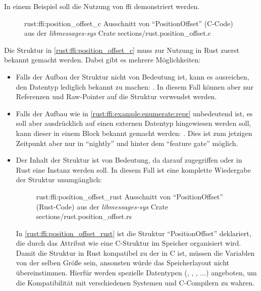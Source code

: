 In einem Beispiel soll die Nutzung von \gls{ffi} demonstriert werden.

\begin{figure}[H]
	\ccinclude
		{rust:ffi:position_offset_c}
		{Ausschnitt von \enquote{PositionOffset} (C-Code) aus der \textit{libmessages-sys} Crate}
		{sections/rust.position_offset.c}
	
\end{figure}

Die Struktur in \autoref{rust:ffi:position_offset_c} muss zur Nutzung in Rust zuerst bekannt gemacht werden.
Dabei gibt es mehrere Möglichkeiten:
\begin{itemize}
	\item Falls der Aufbau der Struktur nicht von Bedeutung ist, kann es ausreichen, den Datentyp lediglich bekannt zu machen: .
	In diesem Fall können aber nur Referenzen und Raw-Pointer auf die Struktur verwendet werden.
	\label{rust:ffi:example:enumerate:repr}
	
	\item Falls der Aufbau wie in \autoref{rust:ffi:example:enumerate:repr} unbedeutend ist, es soll aber ausdrücklich auf einen externen Datentyp hingewiesen werden soll, kann dieser in einem  Block bekannt gemacht werden:  \cite{rust:github:extern_type}.
	Dies ist zum jetzigen Zeitpunkt aber nur in \enquote{nightly} und hinter dem \enquote{feature gate}  möglich.
	
	\item Der Inhalt der Struktur ist von Bedeutung, da darauf zugegriffen oder in Rust eine Instanz werden soll. In diesem Fall ist eine komplette Wiedergabe der Struktur unumgänglich:
	\begin{figure}[H]
		\rustcinclude
			{rust:ffi:position_offset_rust}
			{Ausschnitt von \enquote{PositionOffset} (Rust-Code) aus der \textit{libmessages-sys} Crate}
			{sections/rust.position_offset.rs}
	\end{figure}
	
	In \autoref{rust:ffi:position_offset_rust} ist die Struktur \enquote{PositionOffset} deklariert,
	die durch das Attribut \rustcinline{#[repr(C)]} wie eine C-Struktur im Speicher organisiert wird.
	Damit die Struktur in Rust kompatibel zu der in C ist, müssen die Variablen von der selben Größe sein, ansonsten würde das Speicherlayout nicht übereinstimmen.
	Hierfür werden spezielle Datentypen (, , , ...) angeboten, um die Kompatibilität mit verschiedenen Systemen und C-Compilern zu wahren.
	

\end{itemize}
